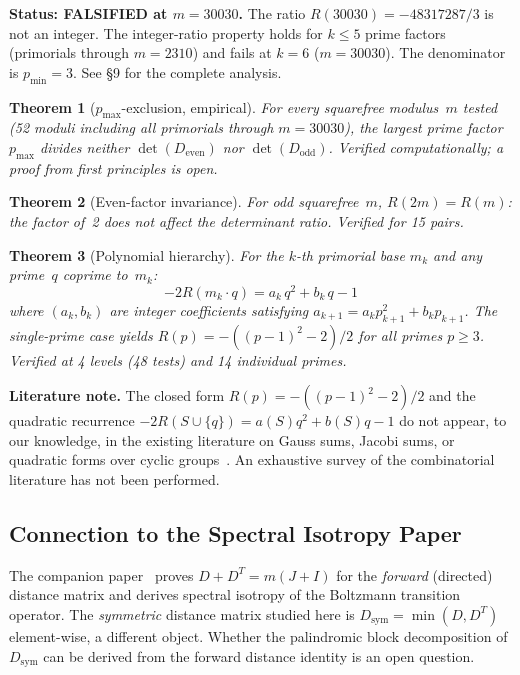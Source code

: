 \documentclass[11pt,letterpaper]{article}
\newtheorem{theorem}{Theorem}[section]
\theoremstyle{definition}
\begin{document}
\textbf{Status: FALSIFIED at $m = 30030$.} The ratio $R(30030) = -48317287/3$ is not an integer. The integer-ratio property holds for $k \leq 5$ prime factors (primorials through $m = 2310$) and fails at $k = 6$ ($m = 30030$). The denominator is $p_{\text{min}} = 3$. See \S9 for the complete analysis.

\begin{theorem}[$p_{\text{max}}$-exclusion, empirical]
For every squarefree modulus~$m$ tested (52 moduli including all primorials through $m = 30030$), the largest prime factor $p_{\text{max}}$ divides neither $\det(D_{\text{even}})$ nor $\det(D_{\text{odd}})$. Verified computationally; a proof from first principles is open.
\end{theorem}

\begin{theorem}[Even-factor invariance]
For odd squarefree~$m$, $R(2m) = R(m)$: the factor of~2 does not affect the determinant ratio. Verified for 15 pairs.
\end{theorem}

\begin{theorem}[Polynomial hierarchy]
For the $k$-th primorial base $m_k$ and any prime~$q$ coprime to~$m_k$:
\[
-2R(m_k \cdot q) = a_k \, q^2 + b_k \, q - 1
\]
where $(a_k, b_k)$ are integer coefficients satisfying $a_{k+1} = a_k p_{k+1}^2 + b_k p_{k+1}$. The single-prime case yields $R(p) = -((p-1)^2 - 2)/2$ for all primes $p \geq 3$. Verified at 4 levels (48 tests) and 14 individual primes.
\end{theorem}

\textbf{Literature note.} The closed form $R(p) = -((p-1)^2 - 2)/2$ and the quadratic recurrence $-2R(S \cup \{q\}) = a(S)q^2 + b(S)q - 1$ do not appear, to our knowledge, in the existing literature on Gauss sums, Jacobi sums, or quadratic forms over cyclic groups~\cite{ireland2010, berndt1998}. An exhaustive survey of the combinatorial literature has not been performed.

\subsection{Connection to the Spectral Isotropy Paper}

The companion paper~\cite{matos2026spectral} proves $D + D^T = m(J + I)$ for the \emph{forward} (directed) distance matrix and derives spectral isotropy of the Boltzmann transition operator. The \emph{symmetric} distance matrix studied here is $D_{\text{sym}} = \min(D, D^T)$ element-wise, a different object. Whether the palindromic block decomposition of $D_{\text{sym}}$ can be derived from the forward distance identity is an open question.
\end{document}
